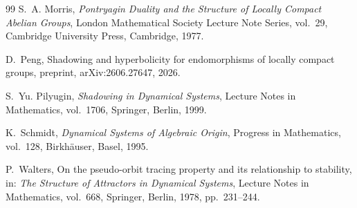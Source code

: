 \documentclass[12pt]{amsart}
\theoremstyle{definition}
\numberwithin{equation}{section}
\theoremstyle{remark}
\begin{document}
\begin{thebibliography}{99}
S.~A. Morris,
\emph{Pontryagin Duality and the Structure of Locally Compact Abelian Groups},
London Mathematical Society Lecture Note Series, vol.~29,
Cambridge University Press, Cambridge, 1977.

D.~Peng, Shadowing and hyperbolicity for endomorphisms of locally compact groups, 
preprint, arXiv:2606.27647, 2026.

S.~Yu. Pilyugin,
\emph{Shadowing in Dynamical Systems},
Lecture Notes in Mathematics, vol.~1706,
Springer, Berlin, 1999.

K.~Schmidt,
\emph{Dynamical Systems of Algebraic Origin},
Progress in Mathematics, vol.~128,
Birkh\"auser, Basel, 1995.

P.~Walters,
On the pseudo-orbit tracing property and its relationship to stability,
in: \emph{The Structure of Attractors in Dynamical Systems},
Lecture Notes in Mathematics, vol.~668,
Springer, Berlin, 1978, pp.~231--244.

\end{thebibliography}
\end{document}
